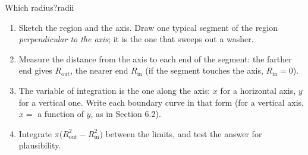 \documentclass[11pt]{article}
\begin{document}
\begin{proc}{Which radius?}{radii}
\begin{enumerate}[nosep]
  \item Sketch the region and the axis. Draw one typical segment of the region \emph{perpendicular to the axis}; it is the one that sweeps out a washer.
  \item Measure the distance from the axis to each end of the segment: the farther end gives $R_{\mathrm{out}}$, the nearer end $R_{\mathrm{in}}$ (if the segment touches the axis, $R_{\mathrm{in}}=0$).
  \item The variable of integration is the one along the axis: $x$ for a horizontal axis, $y$ for a vertical one. Write each boundary curve in that form (for a vertical axis, $x=$ a function of $y$, as in Section 6.2).
  \item Integrate $\pi\bigl(R_{\mathrm{out}}^2-R_{\mathrm{in}}^2\bigr)$ between the limits, and test the answer for plausibility.
\end{enumerate}
\end{proc}
\end{document}
